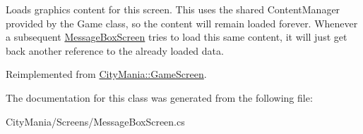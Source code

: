 Loads graphics content for this screen. This uses the shared ContentManager provided by the Game class, so the content will remain loaded forever. Whenever a subsequent \hyperlink{classCityMania_1_1MessageBoxScreen}{MessageBoxScreen} tries to load this same content, it will just get back another reference to the already loaded data. 

Reimplemented from \hyperlink{classCityMania_1_1GameScreen_a4dc3798784fff49b20280903d796c94c}{CityMania::GameScreen}.

The documentation for this class was generated from the following file:\begin{DoxyCompactItemize}
\item 
CityMania/Screens/MessageBoxScreen.cs\end{DoxyCompactItemize}
